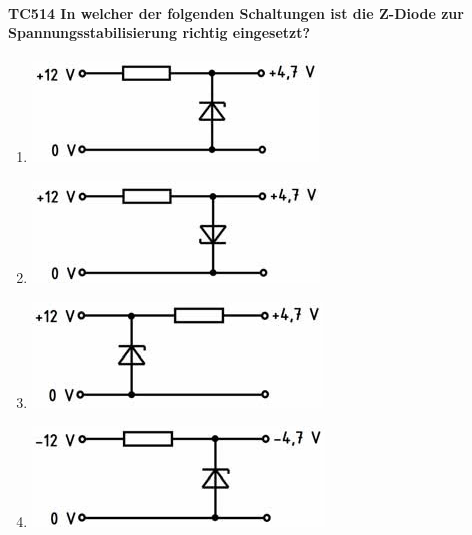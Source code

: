 \documentclass[8pt]{article}
\begin{document}
\begin{enumerate}
\begin{enumerate}[nolistsep,label=\Alph*]
{\begin{enumerate}[nolistsep,label=\Alph*]
\paragraph*{TC514 In welcher der folgenden Schaltungen ist die Z-Diode zur Spannungsstabilisierung richtig eingesetzt?}
\begin{enumerate}[nolistsep,label=\Alph*]
\item
	\begin{center}
		\begin{minipage}{\linewidth}
			\centering
			\includegraphics[scale=1.0]{pics/tc514_a.jpg}
		\end{minipage}
	\end{center}
\item
	\begin{center}
		\begin{minipage}{\linewidth}
			\centering
			\includegraphics[scale=1.0]{pics/tc514_b.jpg}
		\end{minipage}
	\end{center}
\item
	\begin{center}
		\begin{minipage}{\linewidth}
			\centering
			\includegraphics[scale=1.0]{pics/tc514_c.jpg}
		\end{minipage}
	\end{center}
\item
	\begin{center}
		\begin{minipage}{\linewidth}
			\centering
			\includegraphics[scale=1.0]{pics/tc514_d.jpg}
		\end{minipage}
	\end{center}
\end{enumerate}


\end{enumerate}}
\end{enumerate}
\end{enumerate}
\end{document}
